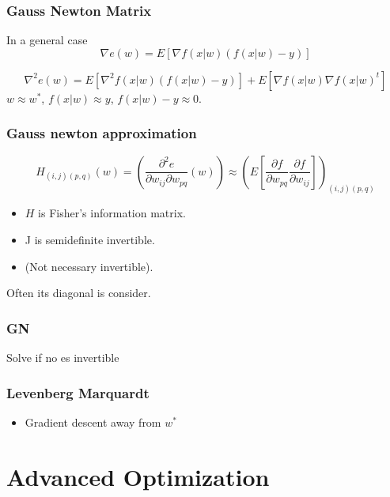 \begin{frame}
  \frametitle{Gauss Newton Matrix}
In a general case
  \begin{equation}
    \nabla e(w)
    = 
    E[
      \nabla f(x|w)
      (f(x|w) - y)
    ]
  \end{equation}


  \begin{equation}
    \nabla^2 e(w)
    = 
    E[
      \nabla^2 f(x|w)
      (f(x|w) - y)
    ]
    + 
    E[
      \nabla f(x|w)
      \nabla f(x|w)^t
    ]
  \end{equation}
$w \approx w^*$, $f(x|w) \approx y$,
$f(x|w) - y \approx 0$.

\end{frame}

\begin{frame}
  \frametitle{Gauss newton approximation }
  \begin{equation}
    H_{(i,j)(p,q)}(w)
    =
    \left(
      \frac{\partial^2 e}{\partial w_{i j} \partial w_{p q}}(w)
    \right)
    \approx
    \left(
      E
      \left[
        \frac{\partial f}{\partial w_{p q}}
        \frac{\partial f}{\partial w_{i j}}
      \right]
    \right)_{(i,j)(p,q)}
  \end{equation}
  \begin{itemize}
    \item $H$ is Fisher's information matrix. 
    \item J is semidefinite invertible. 
    \item (Not necessary invertible).
  \end{itemize}

  Often its diagonal is consider.
\end{frame}

\begin{frame}
  \frametitle{GN}
Solve if no es invertible
  

\end{frame}
    

\begin{frame}
  \frametitle{Levenberg Marquardt}

  \begin{itemize}
    \item Gradient descent away from $w^*$
  \end{itemize}
\end{frame}

\section{Advanced Optimization}


